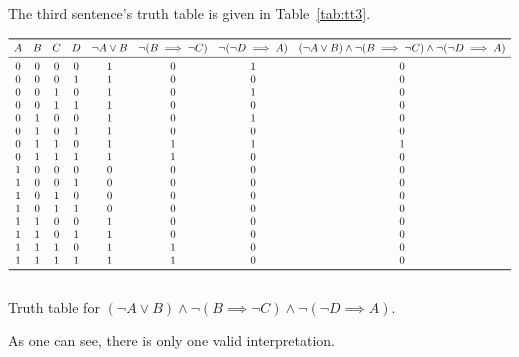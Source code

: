 \documentclass[journal,onecolumn]{IEEEtran}
\begin{document}
\begin{enumerate}
	The third sentence's truth table is given in Table~\ref{tab:tt3}.
	\begin{table}[H]
		\centering
		\(
		\begin{array}{cccc@{\quad}cccc}
		\toprule
		A & B & C & D & \lnot A \lor B & \lnot(B \implies \lnot C) & \lnot(\lnot D \implies A) & (\lnot A \lor B) \land \lnot(B \implies \lnot C) \land \lnot(\lnot D \implies A)\\
		\midrule
		0 & 0 & 0 & 0 & 1 & 0 & 1 & 0 \\
		0 & 0 & 0 & 1 & 1 & 0 & 0 & 0 \\
		0 & 0 & 1 & 0 & 1 & 0 & 1 & 0 \\
		0 & 0 & 1 & 1 & 1 & 0 & 0 & 0 \\
		0 & 1 & 0 & 0 & 1 & 0 & 1 & 0 \\
		0 & 1 & 0 & 1 & 1 & 0 & 0 & 0 \\
		0 & 1 & 1 & 0 & 1 & 1 & 1 & 1 \\
		0 & 1 & 1 & 1 & 1 & 1 & 0 & 0 \\
		1 & 0 & 0 & 0 & 0 & 0 & 0 & 0 \\
		1 & 0 & 0 & 1 & 0 & 0 & 0 & 0 \\
		1 & 0 & 1 & 0 & 0 & 0 & 0 & 0 \\
		1 & 0 & 1 & 1 & 0 & 0 & 0 & 0 \\
		1 & 1 & 0 & 0 & 1 & 0 & 0 & 0 \\
		1 & 1 & 0 & 1 & 1 & 0 & 0 & 0 \\
		1 & 1 & 1 & 0 & 1 & 1 & 0 & 0 \\
		1 & 1 & 1 & 1 & 1 & 1 & 0 & 0 \\
		\bottomrule\\
		\end{array}
		\)
		\caption{Truth table for \((\lnot A \lor B) \land \lnot(B \implies \lnot C) \land \lnot(\lnot D \implies A)\).}
		\label{tab:tt3}
	\end{table}
	As one can see, there is only one valid interpretation.
\end{enumerate}
\end{document}
